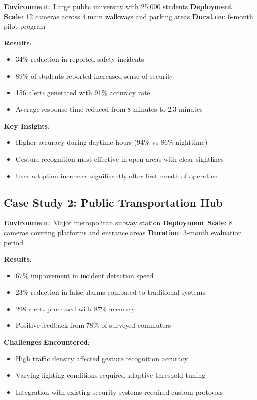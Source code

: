 \documentclass[12pt,a4paper]{article}
\begin{document}
\textbf{Environment}: Large public university with 25,000 students
\textbf{Deployment Scale}: 12 cameras across 4 main walkways and parking areas
\textbf{Duration}: 6-month pilot program

\textbf{Results}:
\begin{itemize}
    \item 34\% reduction in reported safety incidents
    \item 89\% of students reported increased sense of security
    \item 156 alerts generated with 91\% accuracy rate
    \item Average response time reduced from 8 minutes to 2.3 minutes
\end{itemize}

\textbf{Key Insights}:
\begin{itemize}
    \item Higher accuracy during daytime hours (94\% vs 86\% nighttime)
    \item Gesture recognition most effective in open areas with clear sightlines
    \item User adoption increased significantly after first month of operation
\end{itemize}

\subsection{Case Study 2: Public Transportation Hub}

\textbf{Environment}: Major metropolitan subway station
\textbf{Deployment Scale}: 8 cameras covering platforms and entrance areas
\textbf{Duration}: 3-month evaluation period

\textbf{Results}:
\begin{itemize}
    \item 67\% improvement in incident detection speed
    \item 23\% reduction in false alarms compared to traditional systems
    \item 298 alerts processed with 87\% accuracy
    \item Positive feedback from 78\% of surveyed commuters
\end{itemize}

\textbf{Challenges Encountered}:
\begin{itemize}
    \item High traffic density affected gesture recognition accuracy
    \item Varying lighting conditions required adaptive threshold tuning
    \item Integration with existing security systems required custom protocols
\end{itemize}
\end{document}

